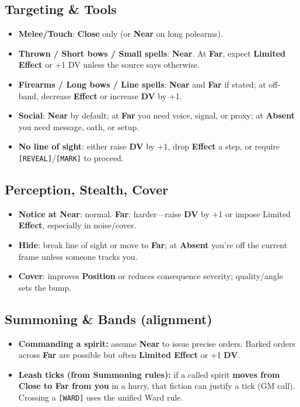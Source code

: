 \documentclass[11pt]{article}
\begin{document}
\subsection*{Targeting \& Tools}
\begin{itemize}
  \item \textbf{Melee/Touch}: \textbf{Close} only (or \textbf{Near} on long polearms).
  \item \textbf{Thrown / Short bows / Small spells}: \textbf{Near}. At \textbf{Far}, expect \textbf{Limited Effect} or +1 DV unless the source says otherwise.
  \item \textbf{Firearms / Long bows / Line spells}: \textbf{Near} and \textbf{Far} if stated; at off-band, decrease \textbf{Effect} or increase \textbf{DV} by +1.
  \item \textbf{Social}: \textbf{Near} by default; at \textbf{Far} you need voice, signal, or proxy; at \textbf{Absent} you need message, oath, or setup.
  \item \textbf{No line of sight}: either raise \textbf{DV} by +1, drop \textbf{Effect} a step, or require \texttt{[REVEAL]}/\texttt{[MARK]} to proceed.
\end{itemize}

\subsection*{Perception, Stealth, Cover}
\begin{itemize}
  \item \textbf{Notice at Near}: normal. \textbf{Far}: harder—raise \textbf{DV} by +1 or impose Limited \textbf{Effect}, especially in noise/cover.
  \item \textbf{Hide}: break line of sight or move to \textbf{Far}; at \textbf{Absent} you're off the current frame unless someone tracks you.
  \item \textbf{Cover}: improves \textbf{Position} or reduces consequence severity; quality/angle sets the bump.
\end{itemize}

\subsection*{Summoning \& Bands (alignment)}
\begin{itemize}
  \item \textbf{Commanding a spirit:} assume \textbf{Near} to issue precise orders. Barked orders across \textbf{Far} are possible but often \textbf{Limited Effect} or +1 \textbf{DV}.
  \item \textbf{Leash ticks (from Summoning rules):} if a called spirit \textbf{moves from Close to Far from you} in a hurry, that fiction can justify a tick (GM call). Crossing a \texttt{[WARD]} uses the unified Ward rule.
\end{itemize}
\end{document}
